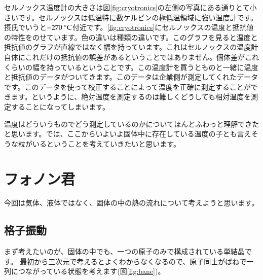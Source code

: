 \documentclass[10pt,b5paper,papersize,dvipdfmx]{jsbook}
\begin{document}
セルノックス温度計の大きさは図\ref{fig:cryotronics}の左側の写真にある通りとて小さいです。セルノックスは低温特に数ケルビンの極低温領域に強い温度計です。摂氏でいうと$-270\ ^\circ \rm{C}$付近です。\ref{fig:cryotronics}にセルノックスの温度と抵抗値の特性をのせています。色の違いは種類の違いです。このグラフを見ると温度と抵抗値のグラフが直線ではなく幅を持っています。これはセルノックスの温度計自体にこれだけの抵抗値の誤差があるということではありません。個体差がこれくらいの幅を持っているということです。この温度計を買うとものと一緒に温度と抵抗値のデータがついてきます。このデータは企業側が測定してくれたデータです。このデータを使って校正することによって温度を正確に測定することができます。というように、絶対温度を測定するのは難しくどうしても相対温度を測定することになってしまいます。\par
温度はどういうものでどう測定しているのかについてほんとふわっと理解できたと思います。では、ここからいよいよ固体中に存在している温度の子とも言えそうな粒がいるということを考えていきたいと思います。

\section{フォノン君}
今回は気体、液体ではなく、固体の中の熱の流れについて考えようと思います。
\subsection{格子振動}
まず考えたいのが、固体の中でも、一つの原子のみで構成されている単結晶です。
最初から三次元で考えるとよくわからなくなるので、原子同士がばねで一列につながっている状態を考えます(図\ref{fig:bane})。\par
\end{document}
